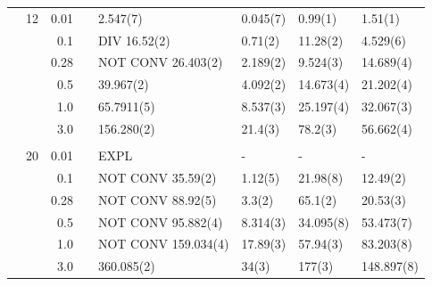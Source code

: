\begin{table}
\begin{tabularx}{\textwidth}{R{1.5cm}rrcR{2.3cm}R{2.3cm}R{2.3cm}R{2.3cm}}
		&12 & 0.01 && 2.547(7) & 0.045(7) & 0.99(1) & 1.51(1) \\
		&& 0.1 && DIV 16.52(2) & 0.71(2) & 11.28(2) & 4.529(6) \\
		&& 0.28 && NOT CONV 26.403(2) & 2.189(2) & 9.524(3) & 14.689(4) \\
		&& 0.5 && 39.967(2) & 4.092(2) & 14.673(4) & 21.202(4) \\
		&& 1.0 && 65.7911(5) & 8.537(3) & 25.197(4) & 32.067(3) \\
		&& 3.0 && 156.280(2) & 21.4(3) & 78.2(3) & 56.662(4) \\ \hdashline \\
		
		&20 & 0.01 && EXPL & - & - & - \\
		&& 0.1 && NOT CONV 35.59(2) & 1.12(5) & 21.98(8) & 12.49(2) \\
		&& 0.28 && NOT CONV 88.92(5) & 3.3(2) & 65.1(2) & 20.53(3) \\
		&& 0.5 && NOT CONV 95.882(4) & 8.314(3) & 34.095(8) & 53.473(7) \\
		&& 1.0 && NOT CONV 159.034(4) & 17.89(3) & 57.94(3) & 83.203(8) \\
		&& 3.0 && 360.085(2) & 34(3) & 177(3) & 148.897(8) \\ \hline \hline
	\end{tabularx}
\end{table} 

